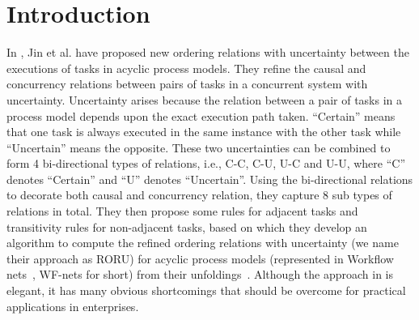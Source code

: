 \documentclass{llncs}
\begin{document}
\section{Introduction}\label{sec:introduction}

In \cite{jin2014computing}, Jin et al. have proposed new ordering relations with uncertainty between the executions of tasks in acyclic process models. They refine the causal and concurrency relations between pairs of tasks in a concurrent system with uncertainty. Uncertainty arises because the relation between a pair of tasks in a process model depends upon the exact execution path taken. ``Certain'' means that one task is always executed in the same instance with the other task while ``Uncertain'' means the opposite. These two uncertainties can be combined to form 4 bi-directional types of relations, i.e., C-C, C-U, U-C and U-U, where ``C'' denotes ``Certain'' and ``U'' denotes ``Uncertain''. Using the bi-directional relations to decorate both causal and concurrency relation, they capture 8 sub types of relations in total. They then propose some rules for adjacent tasks and transitivity rules for non-adjacent tasks, based on which they develop an algorithm to compute the refined ordering relations with uncertainty (we name their approach as RORU) for acyclic process models (represented in Workflow nets~\cite{van1998application}, WF-nets for short) from their unfoldings~\cite{mcmillan1995technique,esparza2002improvement}. Although the approach in \cite{jin2014computing} is elegant, it has many obvious shortcomings that should be overcome for practical applications in enterprises.
\end{document}
